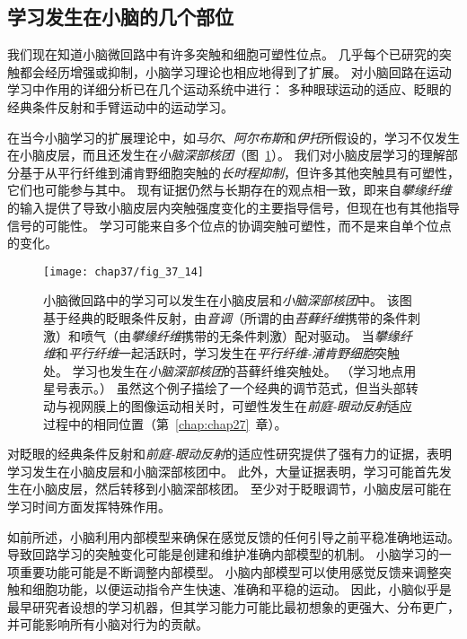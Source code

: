 \subsection{学习发生在小脑的几个部位}

我们现在知道小脑微回路中有许多突触和细胞可塑性位点。
几乎每个已研究的突触都会经历增强或抑制，小脑学习理论也相应地得到了扩展。
对小脑回路在运动学习中作用的详细分析已在几个运动系统中进行：
多种眼球运动的适应、眨眼的经典条件反射和手臂运动中的运动学习。


在当今小脑学习的扩展理论中，如\textit{马尔}、\textit{阿尔布斯}和\textit{伊托}所假设的，学习不仅发生在小脑皮层，而且还发生在\textit{小脑深部核团}（图~\ref{fig:37_14}）。
我们对小脑皮层学习的理解部分基于从平行纤维到浦肯野细胞突触的\textit{长时程抑制}，但许多其他突触具有可塑性，它们也可能参与其中。
现有证据仍然与长期存在的观点相一致，即来自\textit{攀缘纤维}的输入提供了导致小脑皮层内突触强度变化的主要指导信号，但现在也有其他指导信号的可能性。
学习可能来自多个位点的协调突触可塑性，而不是来自单个位点的变化。


\begin{figure}[htbp]
	\centering
	\texttt{[image: chap37/fig\_37\_14]}
	\caption{小脑微回路中的学习可以发生在小脑皮层和\textit{小脑深部核团}中。
		该图基于经典的眨眼条件反射，由\textit{音调}（所谓的由\textit{苔藓纤维}携带的条件刺激）和喷气（由\textit{攀缘纤维}携带的无条件刺激）配对驱动。
		当\textit{攀缘纤维}和\textit{平行纤维}一起活跃时，学习发生在\textit{平行纤维-浦肯野细胞}突触处。
		学习也发生在\textit{小脑深部核团}的苔藓纤维突触处。
		（学习地点用星号表示。）
		虽然这个例子描绘了一个经典的调节范式，但当头部转动与视网膜上的图像运动相关时，可塑性发生在\textit{前庭-眼动反射}适应过程中的相同位置（第~\ref{chap:chap27}~章）\cite{carey2002embarrassed}。}
	\label{fig:37_14}
\end{figure}


对眨眼的经典条件反射和\textit{前庭-眼动反射}的适应性研究提供了强有力的证据，表明学习发生在小脑皮层和小脑深部核团中。
此外，大量证据表明，学习可能首先发生在小脑皮层，然后转移到小脑深部核团。
至少对于眨眼调节，小脑皮层可能在学习时间方面发挥特殊作用。


如前所述，小脑利用内部模型来确保在感觉反馈的任何引导之前平稳准确地运动。
导致回路学习的突触变化可能是创建和维护准确内部模型的机制。
小脑学习的一项重要功能可能是不断调整内部模型。
小脑内部模型可以使用感觉反馈来调整突触和细胞功能，以便运动指令产生快速、准确和平稳的运动。
因此，小脑似乎是最早研究者设想的学习机器，但其学习能力可能比最初想象的更强大、分布更广，并可能影响所有小脑对行为的贡献。



